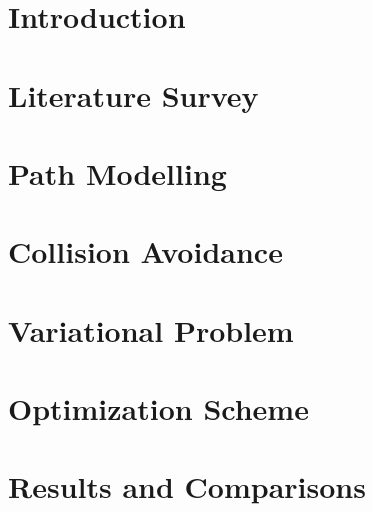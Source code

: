 \documentclass[a4paper,12pt]{report}
\renewcommand{\headrulewidth}{0pt}
\begin{document}
\fancyfoot[CO]{\thepage}

\newpage
\newpage
{}
\setcounter{page}{2}

\newpage
{}
	
\newpage
{}

\tableofcontents
{}
\listoffigures
{}
\listoftables
\newpage
{}
\fancyhead[RO]{\thepage}
\fancyhead[LO]{\slshape \leftmark}
\fancyfoot[CO]{}
\renewcommand{\headrulewidth}{0.5pt}

\chapter{Introduction \label{intro}}


\chapter{Literature Survey \label{LR}}


\chapter{Path Modelling\label{path}}


\chapter{Collision Avoidance\label{coldet}}


\chapter{Variational Problem\label{varfom}}


\chapter{Optimization Scheme\label{opti}}


\chapter{Results and Comparisons\label{result}}

\end{document}

